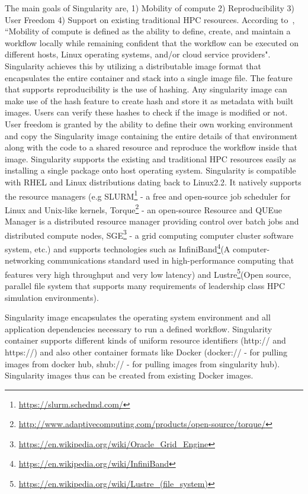 The main goals of Singularity are, 1) Mobility of compute 2) Reproducibility 3) User Freedom 4) Support on existing traditional HPC resources. According to~\cite{10.1371/journal.pone.0177459}, ``Mobility of compute is defined as the ability to define, create, and maintain a workflow locally while remaining confident that the workflow can be executed on different hosts, Linux operating systems, and/or cloud service providers". Singularity achieves this by utilizing a distributable image format that encapsulates the entire container and stack into a single image file. The feature that supports reproducibility is the use of hashing. Any singularity image can make use of the hash feature to create hash and store it as metadata with built images. Users can verify these hashes to check if the image is modified or not. User freedom is granted by the ability to define their own working environment and copy the Singularity image containing the entire details of that environment along with the code to a shared resource and reproduce the workflow inside that image. Singularity supports the existing and traditional HPC resources easily as installing a single package onto host operating system. Singularity is compatible with RHEL and Linux distributions dating back to Linux2.2. It natively supports the resource managers (e.g SLURM\footnote{\url{https://slurm.schedmd.com/}} - a free and open-source job scheduler for Linux and Unix-like kernels, Torque\footnote{\url{http://www.adaptivecomputing.com/products/open-source/torque/}} - an open-source Resource and QUEue Manager is a distributed resource manager providing control over batch jobs and distributed compute nodes, SGE\footnote{\url{https://en.wikipedia.org/wiki/Oracle_Grid_Engine}} - a grid computing computer cluster software system, etc.) and supports technologies such as InfiniBand\footnote{\url{https://en.wikipedia.org/wiki/InfiniBand}}(A computer-networking communications standard used in high-performance computing that features very high throughput and very low latency) and Lustre\footnote{\url{https://en.wikipedia.org/wiki/Lustre_(file_system)}}(Open source, parallel file system that supports many requirements of leadership class HPC simulation environments).

Singularity image encapsulates the operating system environment and all application dependencies necessary to run a defined workflow. Singularity container supports different kinds of uniform resource identifiers (http:// and https://) and also other container formats like Docker (docker:// - for pulling images from docker hub, shub:// - for pulling images from singularity hub). Singularity images thus can be created from existing Docker images.

